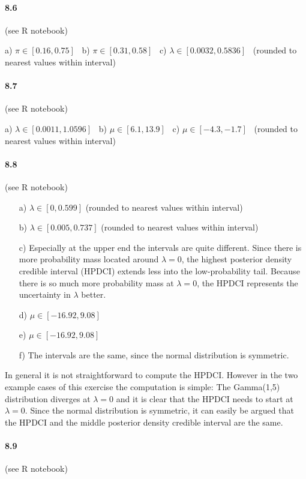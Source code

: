 \documentclass[fontsize=11pt,DIV=18,parskip=half]{scrartcl}
\begin{document}
\paragraph{8.6} (see R notebook)

a) $\pi\in[0.16,0.75]$ \, b) $\pi\in[0.31,0.58]$ \, c) $\lambda\in[0.0032, 0.5836]$ \, (rounded to nearest values within interval)

\paragraph{8.7} (see R notebook)

a) $\lambda\in[0.0011,1.0596]$ \, b) $\mu\in[6.1,13.9]$ \, c) $\mu\in[-4.3,-1.7]$ \, (rounded to nearest values within interval)

\paragraph{8.8} (see R notebook)

\begin{enumerate}
\item[a)] $\lambda \in [0,0.599]$ (rounded to nearest values within interval)
\item[b)] $\lambda \in [0.005, 0.737]$ (rounded to nearest values within interval)
\item[c)] Especially at the upper end the intervals are quite different. Since there is more probability mass located around $\lambda=0$, the highest posterior density credible interval (HPDCI) extends less into the low-probability tail. Because there is so much more probability mass at $\lambda=0$, the HPDCI represents the uncertainty in $\lambda$ better.
\item[d)] $\mu \in [-16.92,9.08]$
\item[e)] $\mu \in [-16.92,9.08]$
\item[f)] The intervals are the same, since the normal distribution is symmetric.
\end{enumerate}

In general it is not straightforward to compute the HPDCI. However in the two example cases of this exercise the computation is simple: The Gamma(1,5) distribution diverges at $\lambda=0$ and it is clear that the HPDCI needs to start at $\lambda=0$. Since the normal distribution is symmetric, it can easily be argued that the HPDCI and the middle posterior density credible interval are the same.

\paragraph{8.9} (see R notebook)
\end{document}
